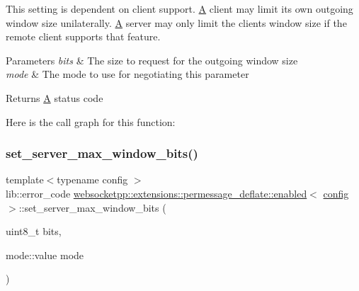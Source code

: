 This setting is dependent on client support. \mbox{\hyperlink{struct_a}{A}} client may limit its own outgoing window size unilaterally. \mbox{\hyperlink{struct_a}{A}} server may only limit the client\textquotesingle{}s window size if the remote client supports that feature.


\begin{DoxyParams}{Parameters}
{\em bits} & The size to request for the outgoing window size \\
\hline
{\em mode} & The mode to use for negotiating this parameter \\
\hline
\end{DoxyParams}
\begin{DoxyReturn}{Returns}
\mbox{\hyperlink{struct_a}{A}} status code 
\end{DoxyReturn}
Here is the call graph for this function\+:
\mbox{\label{classwebsocketpp_1_1extensions_1_1permessage__deflate_1_1enabled_ac2f1bd776c26b4d54afaceded1841394}} 
\subsubsection{\texorpdfstring{set\+\_\+server\+\_\+max\+\_\+window\+\_\+bits()}{set\_server\_max\_window\_bits()}}
{\footnotesize\ttfamily template$<$typename config $>$ \\
lib\+::error\+\_\+code \mbox{\hyperlink{classwebsocketpp_1_1extensions_1_1permessage__deflate_1_1enabled}{websocketpp\+::extensions\+::permessage\+\_\+deflate\+::enabled}}$<$ \mbox{\hyperlink{classconfig}{config}} $>$\+::set\+\_\+server\+\_\+max\+\_\+window\+\_\+bits (\begin{DoxyParamCaption}\item[{uint8\+\_\+t}]{bits,  }\item[{mode\+::value}]{mode }\end{DoxyParamCaption})\hspace{0.3cm}{\ttfamily [inline]}}



